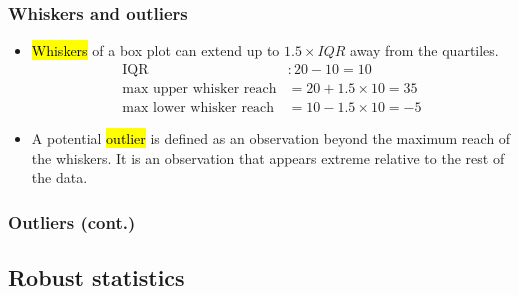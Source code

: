 \begin{frame}[fragile]
\frametitle{Whiskers and outliers}

\begin{itemize}

\item \hl{Whiskers} of a box plot can extend up to $1.5 \times IQR$ away from the quartiles.
\pause
\vspace{-0.5cm}
{\small
\begin{align*}
\text{IQR}&: 20 - 10 = 10 \\
\text{max~upper~whisker~reach}&= 20 + 1.5 \times 10 = 35 \\
\text{max~lower~whisker~reach}&= 10 - 1.5 \times 10 = -5
\end{align*}
}

\pause
\vspace{-0.25cm}
\item A potential \hl{outlier} is defined as an observation beyond the maximum reach of the whiskers. It is an observation that appears extreme relative to the rest of the data.

\end{itemize}

\end{frame}


\begin{frame}
\frametitle{Outliers (cont.)}



\end{frame}


\subsection{Robust statistics}

